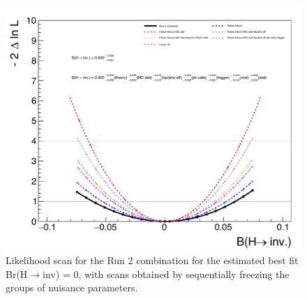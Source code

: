    


   

   


\begin{figure}[htbp]
  \centering
   \includegraphics[width=\textwidth]{FIt_structure/breakdown_expected.pdf}
   
  \caption{Likelihood scan for the Run 2 combination for the estimated best fit Br(H$\rightarrow$inv) = 0, with scans obtained by sequentially freezing the groups of nuisance parameters.}
  \label{app:est_best_fit}
\end{figure}


